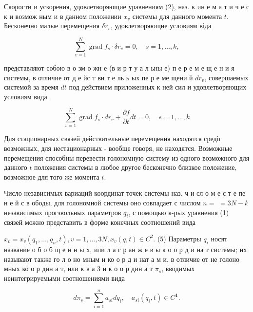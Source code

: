 \documentclass[10pt]{article}
\begin{document}
Скорости и ускорения, удовлетворяющие уравнениям (2), наз. к ин е м а т и ч е с к и возмож ным и в данном положении $x_{v}$ системы для данного момента $t$. Бесконечно малые перемещения $\delta r_{v}$, удовлетворяющие условиям віда



\[

\sum_{v=1}^{N} \operatorname{grad} f_{s} \cdot \delta r_{v}=0, \quad s=1, \ldots, k,

\]



представляют собою в о зм о жн е (в и р т у а л ьны е) п е р е м е щ е н и я системы, в отличие от д е йс т ви т е ль ь ых пе р е ме щени й $d r_{v}$, совершаемых системой за время $d t$ под действием приложенных к ней сил и удовлетворяющих условиям вида



\[

\sum_{v=1}^{N} \operatorname{grad} f_{s} \cdot d r_{v}+\frac{\partial f}{\partial t} d t=0, \quad s=1, \ldots, k

\]



Для стационарных связей действительные перемещения находятся средіг возможных, для нестационарных - вообще говоря, не находятся. Возможные перемещения способны перевести голономную систему из одного возможного для данного $t$ положения системы в любое другое бесконечно близкое положение, возможное для того же момента $t$.



Число независимых вариаций координат точек системы наз. ч и сл о м е с т е пе н е й с в ободы, для голономной системы оно совпадает с числом $n=$ $=3 N-k$ независпмых прогзвольных параметров $q_{i}$, с помощью к-рых уравнения (1) связей можно представить в форме конечных соотношений вида



$x_{v}=x_{v}\left(q_{1}, \ldots, q_{n}, t\right), v=1, \ldots, 3 N, x_{v}(q, t) \in C^{2}$. (5) Параметры $q_{i}$ носят название о б о б щ е н н ы х, или л а г р ан ж е в ы $\mathbf{к}$ о о р д и на т системы; их называют также го л о но мным и ко о р д и нат а м и, в отличие от не голоно мных ко о р дин а т, или к в а 3 и к о о р дин а т $\pi_{s}$, вводимых неинтегрируемыми соотношениями вида



\[

d \pi_{s}=\sum_{i=1}^{n} a_{s i} d q_{i}, \quad a_{s i}\left(q_{i}, t\right) \in C^{\mathbf{1}} .

\]
\end{document}
